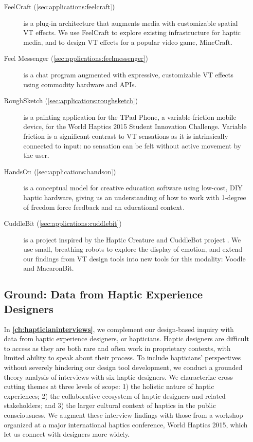 \begin{description}
	\item[FeelCraft (\autoref{sec:applications:feelcraft})] is a plug-in architecture that augments media with customizable spatial VT effects.
	We use FeelCraft to explore existing infrastructure for haptic media, and to design VT effects for a popular video game, MineCraft.
	
	\item[Feel Messenger (\autoref{sec:applications:feelmessenger})] is a chat program augmented with expressive, customizable VT effects using commodity hardware and APIs.
	
	\item[RoughSketch (\autoref{sec:applications:roughsketch})] is a painting application for the TPad Phone, a variable-friction mobile device, for the World Haptics 2015 Student Innovation Challenge. 
	Variable friction is a significant contrast to VT sensations as it is intrinsically connected to input: no sensation can be felt without active movement by the user.
	
	\item[HandsOn (\autoref{sec:applications:handson})] is a conceptual model for creative education software using low-cost, DIY haptic hardware, giving us an understanding of how to work with 1-degree of freedom force feedback and an educational context.

	\item[CuddleBit (\autoref{sec:applications:cuddlebit})] is a project inspired by the Haptic Creature \cite{Yohanan2011affectivetouch,Yohanan2011affectdisplay,Chang2010} and CuddleBot project \cite{Allen2015cuddlebot}.
	We use small, breathing robots to explore the display of emotion, and extend our findings from VT design tools into new tools for this modality: Voodle and MacaronBit.

\end{description}





\subsection{Ground: Data from Haptic Experience Designers}
In \textbf{\autoref{ch:hapticianinterviews}}, we complement our design-based inquiry with data from haptic experience designers, or hapticians.
Haptic designers are difficult to access as they are both rare and often work in proprietary contexts, with limited ability to speak about their process.
To include hapticians' perspectives without severely hindering our design tool development, we conduct a grounded theory analysis of interviews with six haptic designers.
We characterize cross-cutting themes at three levels of scope: 1) the holistic nature of haptic experiences; 2) the collaborative ecosystem of haptic designers and related stakeholders; and 3) the larger cultural context of haptics in the public consciousness.
We augment these interview findings with those from a workshop organized at a major international haptics conference, World Haptics 2015, which let us connect with designers more widely.

